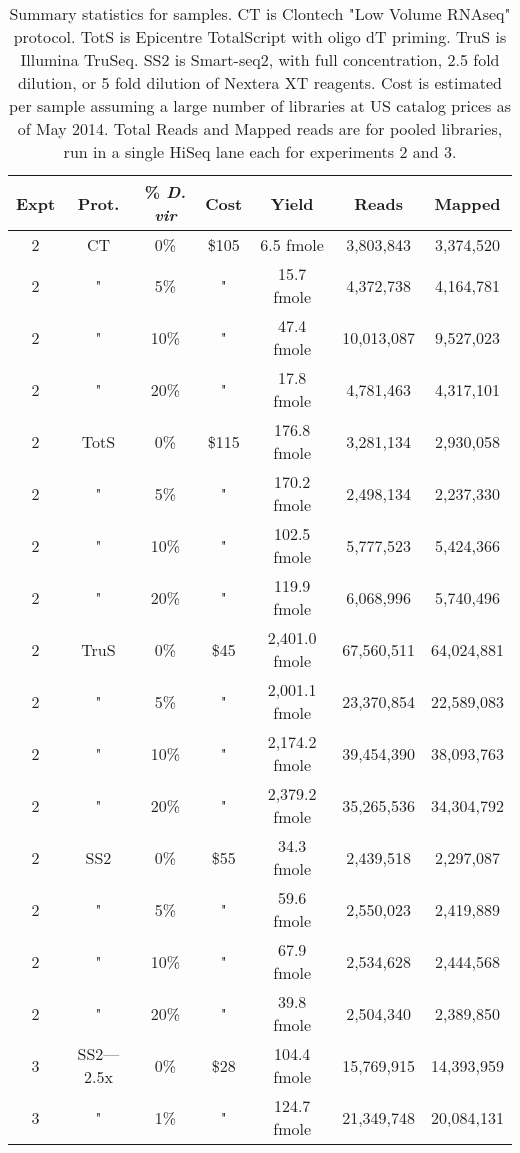 \begin{table}[htdp]
\caption{Summary statistics for samples. CT is Clontech "Low Volume RNAseq" protocol. TotS is Epicentre TotalScript with oligo dT priming. TruS is Illumina TruSeq. SS2 is Smart-seq2, with full concentration, 2.5 fold dilution, or 5 fold dilution of Nextera XT reagents. Cost is estimated per sample assuming a
     large number of libraries at US catalog prices as of May 2014. Total Reads
     and Mapped reads are for pooled libraries, run in a single HiSeq lane each
     for experiments 2 and 3. }
\begin{center}
\begin{tabular}{|c|c|c|c|c|c|c|} \hline
      Expt & Prot. & \% {\em D. vir} & Cost &  Yield &  Reads & Mapped \\\hline 
2 & CT & 0\% & \$105 & 6.5 fmole & 3,803,843 &3,374,520 \\
2 & " & 5\% & " & 15.7 fmole & 4,372,738 &4,164,781 \\
2 & " & 10\% & " & 47.4 fmole & 10,013,087 &9,527,023 \\
2 & " & 20\% & " & 17.8 fmole & 4,781,463 &4,317,101 \\
2 & TotS & 0\% & \$115 & 176.8 fmole & 3,281,134 &2,930,058 \\
2 & " & 5\% & " & 170.2 fmole & 2,498,134 &2,237,330 \\
2 & " & 10\% & " & 102.5 fmole & 5,777,523 &5,424,366 \\
2 & " & 20\% & " & 119.9 fmole & 6,068,996 &5,740,496 \\
2 & TruS & 0\% & \$45 & 2,401.0 fmole & 67,560,511 &64,024,881 \\
2 & " & 5\% & " & 2,001.1 fmole & 23,370,854 &22,589,083 \\
2 & " & 10\% & " & 2,174.2 fmole & 39,454,390 &38,093,763 \\
2 & " & 20\% & " & 2,379.2 fmole & 35,265,536 &34,304,792 \\
2 & SS2 & 0\% & \$55 & 34.3 fmole & 2,439,518 &2,297,087 \\
2 & " & 5\% & " & 59.6 fmole & 2,550,023 &2,419,889 \\
2 & " & 10\% & " & 67.9 fmole & 2,534,628 &2,444,568 \\
2 & " & 20\% & " & 39.8 fmole & 2,504,340 &2,389,850 \\
3 & SS2---2.5x & 0\% & \$28 & 104.4 fmole & 15,769,915 &14,393,959 \\
3 & " & 1\% & " & 124.7 fmole & 21,349,748 &20,084,131 \\

\end{tabular}
\end{center}
\end{table}
